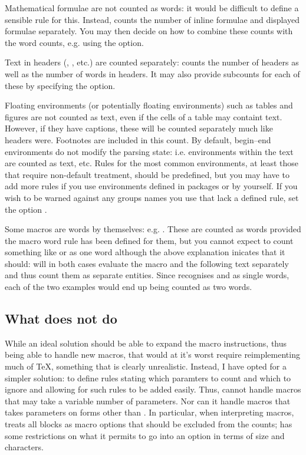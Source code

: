 \documentclass{article}
\begin{document}
Mathematical formulae are not counted as words: it would be difficult to define a sensible rule for this. Instead, \TeXcount{} counts the number of inline formulae and displayed formulae separately. You may then decide on how to combine these counts with the word counts, e.g. using the  option.

Text in headers (, , etc.) are counted separately: \TeXcount{} counts the number of headers as well as the number of words in headers. It may also provide subcounts for each of these by specifying the  option.

Floating environments (or potentially floating environments) such as tables and figures are not counted as text, even if the cells of a table may containt text. However, if they have captions, these will be counted separately much like headers were. Footnotes are included in this count. By default, begin--end environments do not modify the parsing state: i.e. environments within the text are counted as text, etc. Rules for the most common environments, at least those that require non-default treatment, should be predefined, but you may have to add more rules if you use environments defined in packages or by yourself. If you wish to be warned against any groups names you use that lack a defined rule, set the option .

Some macros are words by themselves: e.g. . These are counted as words provided the macro word rule has been defined for them, but you cannot expect \TeXcount{} to count something like  or  as one word although the above explanation inicates that it should: \TeXcount{} will in both cases evaluate the macro and the following text separately and thus count them as separate entities. Since \TeXcount{} recognises  and  as single words, each of the two examples would end up being counted as two words.

\subsection{What \TeXcount{} does not do}

While an ideal solution should be able to expand the macro instructions, thus being able to handle new macros, that would at it's worst require reimplementing much of \TeX{}, something that is clearly unrealistic. Instead, I have opted for a simpler solution: to define rules stating which paramters to count and which to ignore and allowing for such rules to be added easily. Thus, \TeXcount{} cannot handle macros that may take a variable number of parameters. Nor can it handle macros that takes parameters on forms other than . In particular, when interpreting macros, \TeXcount{} treats all \code{[\ldots]} blocks as macro options that should be excluded from the counts; \TeXcount{} has some restrictions on what it permits to go into an option in terms of size and characters. 
\end{document}
